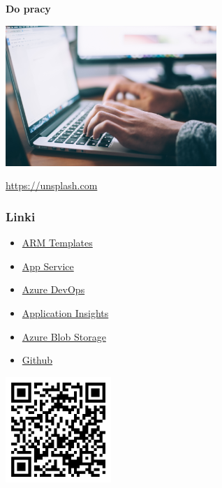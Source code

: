 \documentclass{beamer}
\newcommand{\source}[2]{
	\begin{flushright}
		\hfill {\scriptsize \href{#1}{#2}}	
	\end{flushright}
}
\begin{document}
\begin{frame}
\frametitle{\textbf{}}

\begin{minipage}{0.45\textwidth}
\begin{center}
    {\fontsize{50}{60}\selectfont \textbf{Do \vskip 10mm pracy}}
\end{center}
\end{minipage}
\begin{minipage}{0.45\textwidth}
    \hspace{15mm}
    \includegraphics[width=80mm]{code.jpg}
    \source{https://unsplash.com/photos/npxXWgQ33ZQ}{https://unsplash.com}
\end{minipage}

\end{frame}

\begin{frame}
\frametitle{\textbf{Linki}}

\begin{itemize}
    \item \href{https://docs.microsoft.com/en-us/azure/azure-resource-manager/templates/overview}{ARM Templates}
    \item \href{https://docs.microsoft.com/en-us/azure/app-service/}{App Service}
    \item \href{https://azure.microsoft.com/en-us/services/devops/}{Azure DevOps}
    \item \href{https://docs.microsoft.com/en-us/azure/azure-monitor/app/app-insights-overview}{Application Insights}
    \item \href{https://docs.microsoft.com/en-us/azure/storage/blobs/storage-blobs-introduction}{Azure Blob Storage}
    \item \href{https://github.com/rafalpienkowski/azure-devops-integration}{Github}
\end{itemize}	

\includegraphics[width=40mm]{qr-code.png}

\end{frame}
\end{document}

